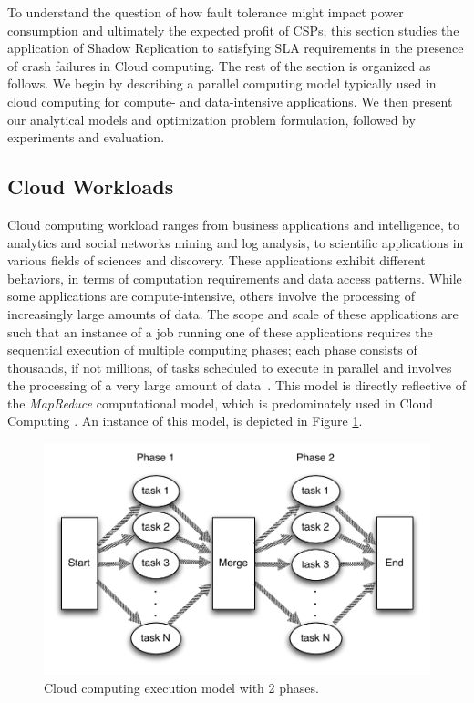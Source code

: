 To understand the question of how
fault tolerance might impact power consumption and ultimately the expected profit of CSPs, this section studies the application of Shadow Replication to satisfying SLA requirements in the presence of crash failures in Cloud computing. The rest of the section is organized as follows. We begin by describing a parallel computing model typically used in cloud computing for compute- and data-intensive applications. We then present our analytical models and optimization problem formulation, followed by experiments and evaluation. 


\subsection{Cloud Workloads}
Cloud computing workload ranges from business applications and
intelligence, to analytics and social networks mining and log
analysis, to scientific applications in various fields of sciences and
discovery. These applications exhibit different behaviors, in terms of
computation requirements and data access patterns. While some
applications are compute-intensive, others involve the processing of
increasingly large amounts of data. The scope and scale of these
applications are such that an instance of a job running one of these
applications requires the sequential execution of multiple computing
phases; each phase consists of thousands, if not millions, of tasks
scheduled to execute in parallel and involves the processing of a very
large amount of data~\cite{lin2010data,Ferdman:2012:CCS:2150976.2150982}. This
model is directly reflective of the \emph{MapReduce} computational
model, which is predominately used in
Cloud Computing \cite{mrbs}.  An instance of this model, is depicted in Figure \ref{fig:map_reduce}.


\begin{figure}[!h]
	\begin{center}
		\includegraphics[width=\columnwidth]{Figures/map_reduce.pdf}
	\end{center}
	\caption{Cloud computing execution model with 2 phases.}
	\label{fig:map_reduce}
\end{figure}

